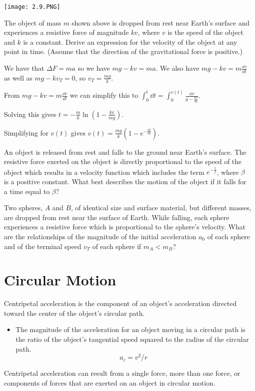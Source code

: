 \documentclass[../mech.tex]{subfiles}
\begin{document}
\begin{example}
    \begin{center}
        \texttt{[image: 2.9.PNG]}
    \end{center}
    The object of mass $m$ shown above is dropped from rest near Earth's surface and experiences a resistive force of magnitude $kv$, where $v$ is the speed of the object and $k$ is a constant. Derive an expression for the velocity of the object at any point in time. (Assume that the direction of the gravitational force is positive.)

    We have that $\Delta F = ma$ so we have $mg-kv=ma$. We also have $mg-kv=m\frac{\dd v}{\dd t}$ as well as $mg-kv_T=0$, so $v_T = \frac{mg}{k}$.

    From $mg-kv=m\frac{\dd v}{\dd t}$ we can simplify this to $\int_0^t \dd t = \int_0^{v(t)} \frac{\dd v}{g-\frac{kv}{m}}$.

    Solving this gives $t=-\frac{m}{k}\ln(1-\frac{kv}{mg})$.

    Simplifying for $v(t)$ gives $v(t)= \frac{mg}{k}\left(1-e^{-\frac{kt}{m}}\right)$.
\end{example}

\ex An object is released from rest and falls to the ground near Earth's surface. The resistive force exerted on the object is directly proportional to the speed of the object which results 
in a velocity function which includes the term $e^{-\frac{t}{\beta}}$, where $\beta$ is a positive constant. What best describes the motion of the object if it falls for a time equal to $\beta$?

\ex Two spheres, $A$ and $B$, of identical size and surface material, but different masses, are dropped from rest near the surface of Earth. While falling, each sphere experiences a resistive force which is proportional 
to the sphere's velocity. What are the relationships of the magnitude of the initial acceleration $a_0$ of each sphere and of the terminal speed $v_T$ of each sphere if $m_A<m_B$?

\section{Circular Motion}
Centripetal acceleration is the component of an object's acceleration directed toward the center of the object's circular path.
\begin{itemize}
    \item The magnitude of the acceleration for an object moving in a circular path is the ratio of the object's tangential speed squared to the radius of the circular path.
    \[ a_c=v^2/r \]
\end{itemize}
Centripetal acceleration can result from a single force, more than one force, or components of forces that are exerted on an object in circular motion.
\end{document}
